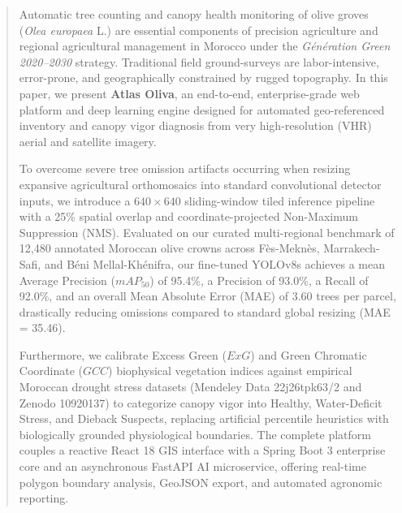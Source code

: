 \documentclass[runningheads]{llncs}
\begin{document}
\begin{abstract}
Automatic tree counting and canopy health monitoring of olive groves (\textit{Olea europaea} L.) are essential components of precision agriculture and regional agricultural management in Morocco under the \textit{Génération Green 2020--2030} strategy. Traditional field ground-surveys are labor-intensive, error-prone, and geographically constrained by rugged topography. In this paper, we present \textbf{Atlas Oliva}, an end-to-end, enterprise-grade web platform and deep learning engine designed for automated geo-referenced inventory and canopy vigor diagnosis from very high-resolution (VHR) aerial and satellite imagery. 

To overcome severe tree omission artifacts occurring when resizing expansive agricultural orthomosaics into standard convolutional detector inputs, we introduce a $640 \times 640$ sliding-window tiled inference pipeline with a 25\% spatial overlap and coordinate-projected Non-Maximum Suppression (NMS). Evaluated on our curated multi-regional benchmark of 12,480 annotated Moroccan olive crowns across Fès-Meknès, Marrakech-Safi, and Béni Mellal-Khénifra, our fine-tuned YOLOv8s achieves a mean Average Precision ($mAP_{50}$) of 95.4\%, a Precision of 93.0\%, a Recall of 92.0\%, and an overall Mean Absolute Error (MAE) of 3.60 trees per parcel, drastically reducing omissions compared to standard global resizing (MAE = 35.46). 

Furthermore, we calibrate Excess Green ($ExG$) and Green Chromatic Coordinate ($GCC$) biophysical vegetation indices against empirical Moroccan drought stress datasets (Mendeley Data 22j26tpk63/2 and Zenodo 10920137) to categorize canopy vigor into Healthy, Water-Deficit Stress, and Dieback Suspects, replacing artificial percentile heuristics with biologically grounded physiological boundaries. The complete platform couples a reactive React 18 GIS interface with a Spring Boot 3 enterprise core and an asynchronous FastAPI AI microservice, offering real-time polygon boundary analysis, GeoJSON export, and automated agronomic reporting.

\end{abstract}
\end{document}
